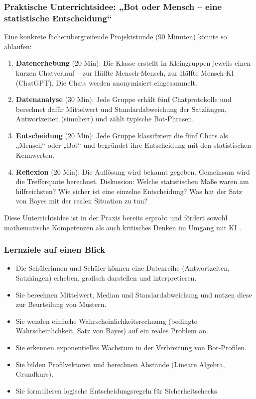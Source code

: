 \documentclass[12pt,a4paper,oneside]{scrartcl}
\begin{document}
	\subsubsection{Praktische Unterrichtsidee: „Bot oder Mensch – eine statistische Entscheidung“}
	
	Eine konkrete fächerübergreifende Projektstunde (90 Minuten) könnte so ablaufen:
	\begin{enumerate}
		\item \textbf{Datenerhebung} (20 Min): Die Klasse erstellt in Kleingruppen jeweils einen kurzen Chatverlauf – zur Hälfte Mensch-Mensch, zur Hälfte Mensch-KI (ChatGPT). Die Chats werden anonymisiert eingesammelt.
		\item \textbf{Datenanalyse} (30 Min): Jede Gruppe erhält fünf Chatprotokolle und berechnet dafür Mittelwert und Standardabweichung der Satzlängen, Antwortzeiten (simuliert) und zählt typische Bot-Phrasen.
		\item \textbf{Entscheidung} (20 Min): Jede Gruppe klassifiziert die fünf Chats als „Mensch“ oder „Bot“ und begründet ihre Entscheidung mit den statistischen Kennwerten.
		\item \textbf{Reflexion} (20 Min): Die Auflösung wird bekannt gegeben. Gemeinsam wird die Trefferquote berechnet. Diskussion: Welche statistischen Maße waren am hilfreichsten? Wie sicher ist eine einzelne Entscheidung? Was hat der Satz von Bayes mit der realen Situation zu tun?
	\end{enumerate}
	Diese Unterrichtsidee ist in der Praxis bereits erprobt und fördert sowohl mathematische Kompetenzen als auch kritisches Denken im Umgang mit KI \cite{Maier2026}.
	
	\subsubsection{Lernziele auf einen Blick}
	
	\begin{itemize}
		\item Die Schülerinnen und Schüler können eine Datenreihe (Antwortzeiten, Satzlängen) erheben, grafisch darstellen und interpretieren.
		\item Sie berechnen Mittelwert, Median und Standardabweichung und nutzen diese zur Beurteilung von Mustern.
		\item Sie wenden einfache Wahrscheinlichkeitsrechnung (bedingte Wahrscheinlichkeit, Satz von Bayes) auf ein reales Problem an.
		\item Sie erkennen exponentielles Wachstum in der Verbreitung von Bot-Profilen.
		\item Sie bilden Profilvektoren und berechnen Abstände (Lineare Algebra, Grundkurs).
		\item Sie formulieren logische Entscheidungsregeln für Sicherheitschecks.
	\end{itemize}
	
\end{document}
